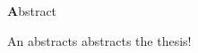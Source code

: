 

\clearemptydoublepage
{}
{}





\vspace*{2cm}
\begin{center}
{\Large \textbf Abstract}
\end{center}
\vspace{1cm}

An abstracts abstracts the thesis!
